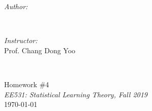 \begin{titlepage}
\begin{minipage}{0.4\textwidth}
\begin{flushleft} \large
\emph{Author:}\\
\@author %
\end{flushleft}
\end{minipage}
~
\begin{minipage}{0.4\textwidth}
\begin{flushright} \large
\emph{Instructor:} \\
Prof. Chang Dong Yoo 
\end{flushright}
\end{minipage}\\[3cm]
\makeatother



{\large Homework \#4}\\[0.5cm]
{\large \emph{EE531: Statistical Learning Theory, Fall 2019}}\\[0.5cm]
{\large \today}\\[2cm] %

\vfill %

\end{titlepage}